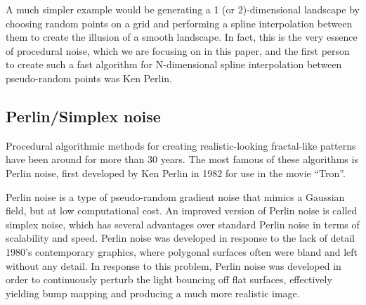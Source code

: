 \documentclass[aps,pre,twocolumn,letterpaper,floatfix,showpacs]{revtex4}
\begin{document}
A much simpler example would be generating a 1 (or 2)-dimensional landscape by choosing random points on a grid and performing a spline interpolation between them to create the illusion of a smooth landscape. In fact, this is the very essence of procedural noise, which we are focusing on in this paper, and the first person to create such a fast algorithm for N-dimensional spline interpolation between pseudo-random points was Ken Perlin.   

\subsection{Perlin/Simplex noise}
\label{sec:perlin}

Procedural algorithmic methods for creating realistic-looking
fractal-like patterns have been around for more than 30 years. The most famous of these
algorithms is Perlin noise, first developed by Ken Perlin in 1982 for
use in the movie ``Tron''.  

Perlin noise is a type of pseudo-random gradient noise that mimics a Gaussian field, but at low computational cost. An improved version of Perlin noise is called simplex noise, which has several advantages over standard Perlin noise in terms of scalability and speed. Perlin noise was developed in response to the lack of detail 1980's contemporary graphics, where polygonal surfaces often were bland and left without any detail. In response to this problem, Perlin noise was developed in order to continuously perturb the light bouncing off flat surfaces, effectively yielding bump mapping and producing a much more realistic image. 
\end{document}
